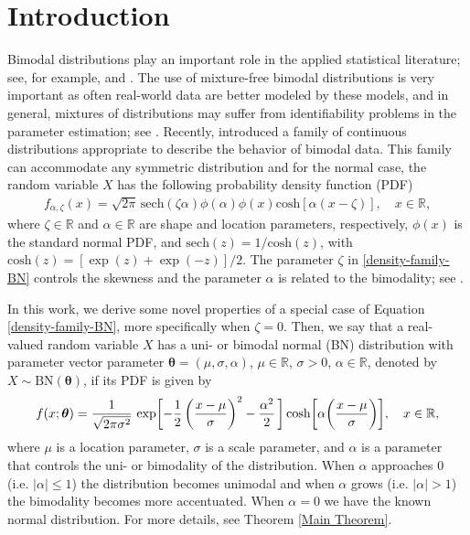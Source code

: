\documentclass[12pt]{article}
\theoremstyle{definition}
\begin{document}
\section{Introduction}
Bimodal distributions play an important role in the applied statistical literature; see, for example, \cite{eugeneetal:02} and \cite{hassanelbassiouni:16}. The use of mixture-free bimodal distributions is very important as often real-world data are better modeled by these models, and in general, mixtures of distributions may suffer from identifiability problems in the parameter estimation; see \cite{vilaetal:20}. Recently, \cite{gomezdenizetal:21} introduced a family of continuous distributions appropriate to describe the behavior of bimodal data. This family can accommodate any symmetric distribution and for the normal case, the random variable $X$ has the following probability density function (PDF) 
\begin{align}\label{density-family-BN}
 f_{\alpha,\zeta}(x)=\sqrt{2\pi}\,\text{sech}(\zeta\alpha)\phi(\alpha)\phi(x)\text{cosh}[\alpha(x-\zeta)], \quad x\in\mathbb{R},
\end{align}
where $\zeta\in\mathbb{R}$ and $\alpha\in\mathbb{R}$ are shape and location parameters, respectively, $\phi(x)$ is the standard normal PDF, and $\text{sech}(z)=1/\text{cosh}(z)$, with $\text{cosh}(z)=[\exp(z)+\exp(-z)]/2$. The parameter $\zeta$ in \eqref{density-family-BN} controls the skewness and the parameter $\alpha$ is related to the bimodality; see \cite{gomezdenizetal:21}.

In this work, we derive some novel properties of a special case of Equation \eqref{density-family-BN}, more specifically when $\zeta = 0$. Then, we say that a real-valued random variable $X$ has a uni- or bimodal normal (BN) distribution with parameter vector parameter $\boldsymbol{\theta}=(\mu,\sigma,\alpha)$, $\mu\in\mathbb{R}$, $\sigma>0$, $\alpha\in \mathbb{R}$, denoted by $X\sim \text{BN}(\boldsymbol{\theta})$, if its PDF is given by
\begin{align}\label{density-BN}
f(x;\boldsymbol{\theta})
=
\dfrac{1}{\sqrt{2\pi\sigma^2}}\,
\exp\biggl[-{1\over 2}\, {\biggl({x-\mu\over \sigma}\biggr)^2 - {\alpha^2\over 2}}\,\biggr] 
\cosh\biggl[\alpha\biggl({ x-\mu\over \sigma}\biggr)\biggr],
\quad x\in\mathbb{R},
\end{align}
where $\mu$ is a location parameter, $\sigma$ is a scale parameter, and $\alpha$ is a parameter that controls the uni- or bimodality of the distribution. When $\alpha$ approaches 0 (i.e. $\vert\alpha\vert\leq 1$) the distribution becomes unimodal and when $\alpha$ grows (i.e. $\vert\alpha\vert>1$) the bimodality becomes more accentuated. When $\alpha=0$ we have the known normal distribution. For more details, see Theorem \ref{Main Theorem}.
\end{document}
